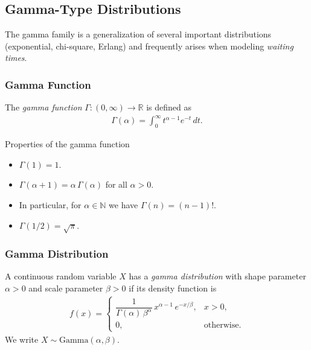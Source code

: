 \subsection{Gamma-Type Distributions}

The gamma family is a generalization of several important distributions (exponential, chi-square, Erlang) and frequently arises when modeling \emph{waiting times}.

\subsubsection{Gamma Function}

\begin{definicion}
The \emph{gamma function} $\Gamma: (0,\infty) \to \mathbb{R}$ is defined as
\begin{align}
 \label{eq:2.8.6}
 \Gamma(\alpha) = \int_0^\infty t^{\alpha-1} e^{-t}\,dt.
\end{align}
\end{definicion}

{Properties of the gamma function}
\begin{itemize}
 \item $\Gamma(1) = 1$.
 \item $\Gamma(\alpha + 1) = \alpha\,\Gamma(\alpha)$ for all $\alpha > 0$.
 \item In particular, for $\alpha \in \mathbb{N}$ we have $\Gamma(n) = (n-1)!$.
 \item $\Gamma(1/2) = \sqrt{\pi}$.
\end{itemize}

\subsubsection{Gamma Distribution}

\begin{definicion}
A continuous random variable $X$ has a \emph{gamma distribution} with shape parameter $\alpha > 0$ and scale parameter $\beta > 0$ if its density function is
\begin{align}
 \label{eq:2.8.7}
 f(x) =
 \begin{cases}
  \dfrac{1}{\Gamma(\alpha)\,\beta^\alpha}\,x^{\alpha-1}\,e^{-x/\beta},
  & x > 0, \\
  0, & \text{otherwise.}
 \end{cases}
\end{align}
We write $X \sim \text{Gamma}(\alpha, \beta)$.
\end{definicion}

